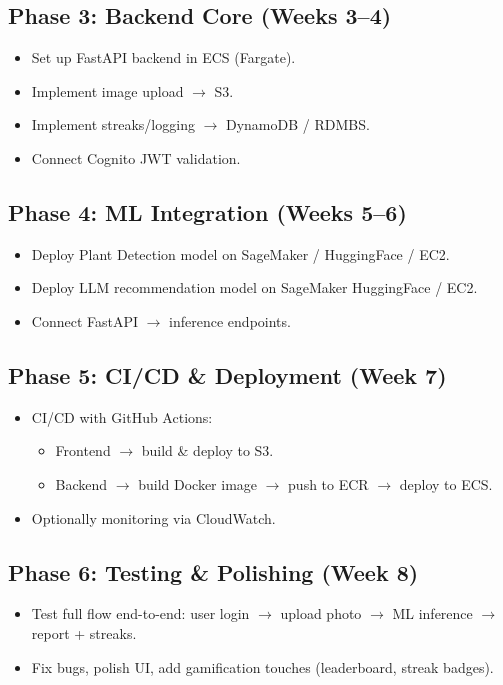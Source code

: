 \documentclass[11pt]{article}
\begin{document}
\subsection*{Phase 3: Backend Core (Weeks 3--4)}
\begin{itemize}
    \item Set up FastAPI backend in ECS (Fargate).
    \item Implement image upload $\rightarrow$ S3.
    \item Implement streaks/logging $\rightarrow$ DynamoDB / RDMBS.
    \item Connect Cognito JWT validation.
\end{itemize}

\subsection*{Phase 4: ML Integration (Weeks 5--6)}
\begin{itemize}
    \item Deploy Plant Detection model on SageMaker / HuggingFace / EC2.
    \item Deploy LLM recommendation model on SageMaker HuggingFace / EC2.
    \item Connect FastAPI $\rightarrow$ inference endpoints.
\end{itemize}

\subsection*{Phase 5: CI/CD \& Deployment (Week 7)}
\begin{itemize}
    \item CI/CD with GitHub Actions:
    \begin{itemize}
        \item Frontend $\rightarrow$ build \& deploy to S3.
        \item Backend $\rightarrow$ build Docker image $\rightarrow$ push to ECR $\rightarrow$ deploy to ECS.
    \end{itemize}
    \item Optionally monitoring via CloudWatch.
\end{itemize}

\subsection*{Phase 6: Testing \& Polishing (Week 8)}
\begin{itemize}
    \item Test full flow end-to-end: user login $\rightarrow$ upload photo $\rightarrow$ ML inference $\rightarrow$ report + streaks.
    \item Fix bugs, polish UI, add gamification touches (leaderboard, streak badges).
\end{itemize}
\end{document}
